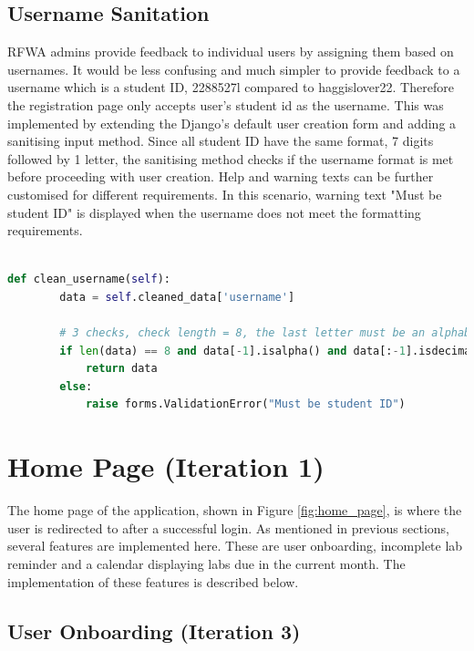 \documentclass{l4proj}
\begin{document}
\subsection{Username Sanitation}
RFWA admins provide feedback to individual users by assigning them based on usernames. It would be less confusing and much simpler to provide feedback to a username which is a student ID, 2288527l compared to haggislover22. Therefore the registration page only accepts user's student id as the username. This was implemented by extending the Django's default user creation form and adding a sanitising input method. Since all student ID have the same format, 7 digits followed by 1 letter, the sanitising method checks if the username format is met before proceeding with user creation. Help and warning texts can be further customised for different requirements. In this scenario, warning text "Must be student ID" is displayed when the username does not meet the formatting requirements.

\begin{lstlisting}[language=python, caption={Sanitising username performed in forms.py.}, label=lst:username_sanitising]

def clean_username(self):
        data = self.cleaned_data['username']

        # 3 checks, check length = 8, the last letter must be an alphabet, the first 7 must be numbers
        if len(data) == 8 and data[-1].isalpha() and data[:-1].isdecimal():
            return data
        else:
            raise forms.ValidationError("Must be student ID")
\end{lstlisting}

\section{Home Page (Iteration 1)}

The home page of the application, shown in Figure \ref{fig:home_page}, is where the user is redirected to after a successful login. As mentioned in previous sections, several features are implemented here. These are user onboarding, incomplete lab reminder and a calendar displaying labs due in the current month. The implementation of these features is described below.

\subsection{User Onboarding (Iteration 3)}
\end{document}
